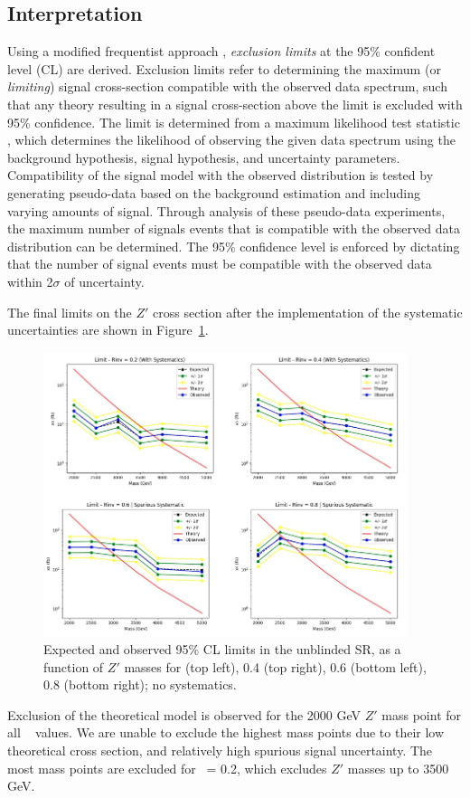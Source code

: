 \subsection{Interpretation}
Using a modified frequentist approach \cite{freq}, \textit{exclusion limits} at the 95\% confident level (CL) are derived.
Exclusion limits refer to determining the maximum (or \textit{limiting}) signal cross-section compatible with the observed data spectrum, such that any theory resulting in a signal cross-section above the limit is excluded with 95\% confidence. 
The limit is determined from a maximum likelihood test statistic \cite{likelihood}, which determines the likelihood of observing the given data spectrum using the background hypothesis, signal hypothesis, and uncertainty parameters.
Compatibility of the signal model with the observed distribution is tested by generating pseudo-data based on the background estimation and including varying amounts of signal.
Through analysis of these pseudo-data experiments, the maximum number of signals events that is compatible with the observed data distribution can be determined.
The 95\% confidence level is enforced by dictating that the number of signal events must be compatible with the observed data within 2$\sigma$ of uncertainty.

The final limits on the $Z'$ cross section after the implementation of the systematic uncertainties are shown in Figure~\ref{fig:unblinded_limits_syst}. 
\begin{figure}[!htbp]
\centering
   \includegraphics[width=0.95\textwidth]{figures/results/final_limits}
    \caption{Expected and observed 95\% CL limits in the unblinded SR, as a function of $Z'$ masses for  (top left), 0.4 (top right), 0.6 (bottom left), 0.8 (bottom right); no systematics.
    \label{fig:unblinded_limits_syst}}
\end{figure}
Exclusion of the theoretical model is observed for the 2000 GeV $Z'$ mass point for all \rinv~ values.
We are unable to exclude the highest mass points due to their low theoretical cross section, and relatively high spurious signal uncertainty.
The most mass points are excluded for \rinv~= 0.2, which excludes $Z'$ masses up to 3500 GeV.

